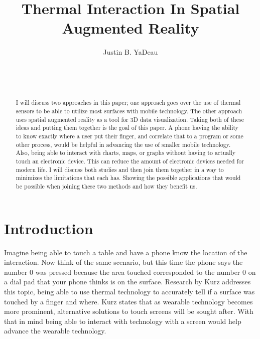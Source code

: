 \documentclass{sig-alternate}
\begin{document}

\title{Thermal Interaction In Spatial Augmented Reality}


\author{
\alignauthor
Justin B. YaDeau\\
	\\
	\\
	\\
}

\maketitle

\begin{abstract}
I will discuss two approaches in this paper; one approach goes over the use of thermal sensors to be able to utilize most surfaces with mobile technology. The other approach uses spatial augmented reality as a tool for 3D data visualization. Taking both of these ideas and putting them together is the goal of this paper. A phone having the ability to know exactly where a user put their finger, and correlate that to a program or some other process, would be helpful in advancing the use of smaller mobile technology. Also, being able to interact with charts, maps, or graphs without having to actually touch an electronic device. This can reduce the amount of electronic devices needed for modern life. I will discuss both studies and then join them together in a way to minimizes the limitations that each has. Showing the possible applications that would be possible when joining these two methods and how they benefit us.

\end{abstract}


\section{Introduction}
\label{sec:Introduction}
Imagine being able to touch a table and have a phone know the location of the interaction. Now think of the same scenario, but this time the phone says the number 0 was pressed because the area touched corresponded to the number 0 on a dial pad that your phone thinks is on the surface. Research by Kurz \cite{Thermal} addresses this topic, being able to use thermal technology to accurately tell if a surface was touched by a finger and where. Kurz \cite{Thermal} states that as wearable technology becomes more prominent, alternative solutions to touch screens will be sought after. With that in mind being able to interact with technology with a screen would help advance the wearable technology.    
\end{document}

